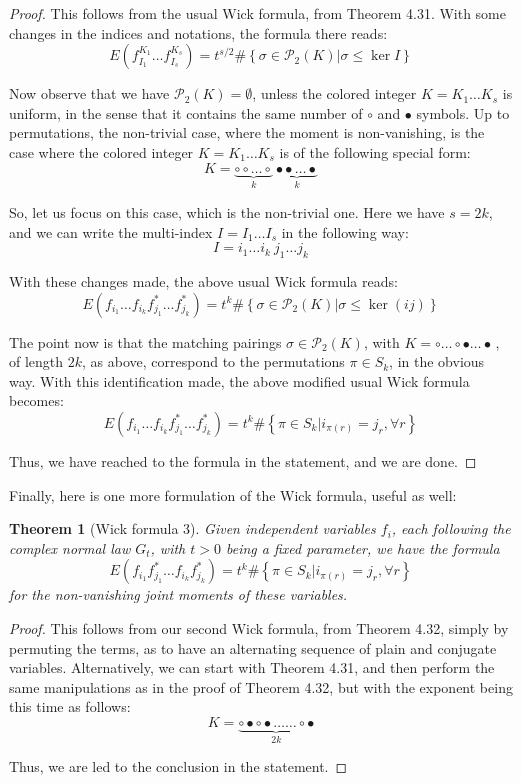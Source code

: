 \documentclass[12pt]{amsbook}
\newtheorem{theorem}{Theorem}[chapter]
\begin{document}
\begin{proof}
This follows from the usual Wick formula, from Theorem 4.31. With some changes in the indices and notations, the formula there reads:
$$E\left(f_{I_1}^{K_1}\ldots f_{I_s}^{K_s}\right)=t^{s/2}\#\left\{\sigma\in\mathcal P_2(K)\Big|\sigma\leq\ker I\right\}$$

Now observe that we have $\mathcal P_2(K)=\emptyset$, unless the colored integer $K=K_1\ldots K_s$ is uniform, in the sense that it contains the same number of $\circ$ and $\bullet$ symbols. Up to permutations, the non-trivial case, where the moment is non-vanishing, is the case where the colored integer $K=K_1\ldots K_s$ is of the following special form:
$$K=\underbrace{\circ\circ\ldots\circ}_k\ \underbrace{\bullet\bullet\ldots\bullet}_k$$

So, let us focus on this case, which is the non-trivial one. Here we have $s=2k$, and we can write the multi-index $I=I_1\ldots I_s$ in the following way:
$$I=i_1\ldots i_k\ j_1\ldots j_k$$

With these changes made, the above usual Wick formula reads:
$$E\left(f_{i_1}\ldots f_{i_k}f_{j_1}^*\ldots f_{j_k}^*\right)=t^k\#\left\{\sigma\in\mathcal P_2(K)\Big|\sigma\leq\ker(ij)\right\}$$

The point now is that the matching pairings $\sigma\in\mathcal P_2(K)$, with $K=\circ\ldots\circ\bullet\ldots\bullet\,$, of length $2k$, as above, correspond to the permutations $\pi\in S_k$, in the obvious way. With this identification made, the above modified usual Wick formula becomes:
$$E\left(f_{i_1}\ldots f_{i_k}f_{j_1}^*\ldots f_{j_k}^*\right)=t^k\#\left\{\pi\in S_k\Big|i_{\pi(r)}=j_r,\forall r\right\}$$

Thus, we have reached to the formula in the statement, and we are done.
\end{proof}

Finally, here is one more formulation of the Wick formula, useful as well:


\begin{theorem}[Wick formula 3]
Given independent variables $f_i$, each following the complex normal law $G_t$, with $t>0$ being a fixed parameter, we have the formula
$$E\left(f_{i_1}f_{j_1}^*\ldots f_{i_k}f_{j_k}^*\right)=t^k\#\left\{\pi\in S_k\Big|i_{\pi(r)}=j_r,\forall r\right\}$$
for the non-vanishing joint moments of these variables.
\end{theorem}

\begin{proof}
This follows from our second Wick formula, from Theorem 4.32, simply by permuting the terms, as to have an alternating sequence of plain and conjugate variables. Alternatively, we can start with Theorem 4.31, and then perform the same manipulations as in the proof of Theorem 4.32, but with the exponent being this time as follows: 
$$K=\underbrace{\circ\bullet\circ\bullet\ldots\ldots\circ\bullet}_{2k}$$

Thus, we are led to the conclusion in the statement.
\end{proof}
\end{document}
